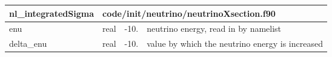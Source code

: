 \documentclass{article}
\begin{document}
\begin{longtable}{llll}
\toprule
\textbf{\large{nl\_integratedSigma}} & \multicolumn{3}{l}{\footnotesize{code/init/neutrino/neutrinoXsection.f90}}\\*
\midrule
\endfirsthead
\midrule
\endhead
enu & \begin{minipage}[t]{2cm}real\end{minipage} & \begin{minipage}[t]{2cm}-10.\end{minipage} & \begin{minipage}[t]{12cm}neutrino energy, read in by namelist\end{minipage}\\*
\midrule
delta\_enu & \begin{minipage}[t]{2cm}real\end{minipage} & \begin{minipage}[t]{2cm}-10.\end{minipage} & \begin{minipage}[t]{12cm}value by which the neutrino energy is increased\end{minipage}\\*
\bottomrule
\end{longtable}
{ }



\end{document}
